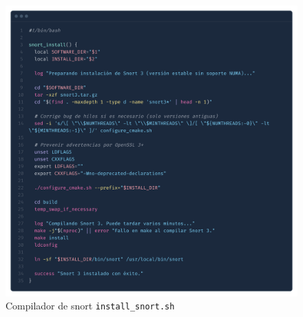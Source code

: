 \documentclass[11pt,a4paper,twoside]{report}
\begin{document}
\begin{figure}[H]
	\centering
	\includegraphics[scale=0.12]{script_automatico/6.png}
	\caption{Compilador de snort \texttt{install\_snort.sh}}
	\label{fig:install-snort}
\end{figure}
\end{document}
